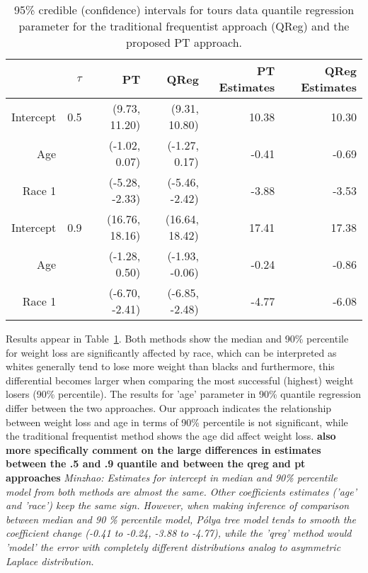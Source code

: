 \documentclass[12pt]{article}
\newcommand{\polya}{P\'{o}lya}
\begin{document}
\begin{table}[h]
  \caption[]{\label{tab:tours} 95\% credible (confidence) intervals for
    tours data quantile regression parameter for the
    traditional frequentist approach (QReg) and the proposed PT approach.}
  \vspace{4mm}

  \centering
  \begin{tabular}{r|r|rrrr}
    \hline
              & $\tau$ & PT             & QReg           & PT Estimates
              & QReg Estimates                                           \\
    \hline
    Intercept & 0.5    & (9.73, 11.20)  & (9.31, 10.80)  & 10.38 & 10.30 \\
    Age       &        & (-1.02, 0.07)  & (-1.27, 0.17)  & -0.41 & -0.69 \\
    Race 1    &        & (-5.28, -2.33) & (-5.46, -2.42) & -3.88 & -3.53 \\
    \hline
    Intercept & 0.9    & (16.76, 18.16) & (16.64, 18.42) & 17.41 & 17.38 \\
    Age       &        & (-1.28, 0.50)  & (-1.93, -0.06) & -0.24 & -0.86 \\
    Race 1    &        & (-6.70, -2.41) & (-6.85, -2.48) & -4.77 & -6.08 \\
    \hline
  \end{tabular}
\end{table}

Results appear in Table~\ref{tab:tours}.
Both methods  show the median
and 90\% percentile for weight loss are significantly  affected by
race, which can be interpreted as whites generally tend to
lose more weight than blacks and furthermore, this differential
becomes larger when comparing the most successful (highest) weight losers (90\%
percentile). The results for 'age'
parameter in 90\% quantile regression differ between the two
approaches.  Our approach
indicates the relationship between weight loss and age in terms of
90\% percentile is not significant, while the traditional frequentist
method shows the age did affect weight loss.
{\bf also more specifically comment on the large differences in
  estimates between the .5 and .9 quantile and between the qreg and pt
  approaches}
{\it Minzhao: Estimates for intercept in median and 90\% percentile
  model from both methods are almost the same. Other coefficients
  estimates ('age' and 'race') keep the same sign. However, when
  making inference of comparison between median and 90 \% percentile
  model, \polya{} tree model tends to smooth the coefficient change
  (-0.41 to -0.24, -3.88 to -4.77), while the 'qreg' method would
  'model' the error with completely different distributions analog to
  asymmetric Laplace distribution.}
\end{document}
